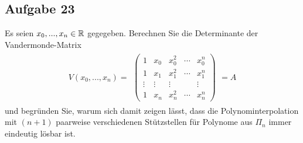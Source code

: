 \subsection*{Aufgabe 23}
Es seien $x_0,...,x_n \in \mathbb R$ gegegeben. Berechnen Sie die Determinante der Vandermonde-Matrix
\begin{align*}
 \label{eq8}
 V(x_0,...,x_n)=
 \begin{split}
 \begin{pmatrix}
 1 & x_0 & x_0^2 & \cdots & x_0^{n} \\
 1 & x_1 & x_1^2 & \cdots & x_1^{n} \\
 \vdots & \vdots & \vdots &  & \vdots \\
 1 & x_n & x_n^2 & \cdots & x_n^{n}
 \end{pmatrix}
 \end{split}
 = A
\end{align*}
und begründen Sie, warum sich damit zeigen lässt, dass die Polynominterpolation mit $(n+1)$ paarweise verschiedenen Stützstellen für Polynome aus $\Pi_n$ immer eindeutig lösbar ist.\\

